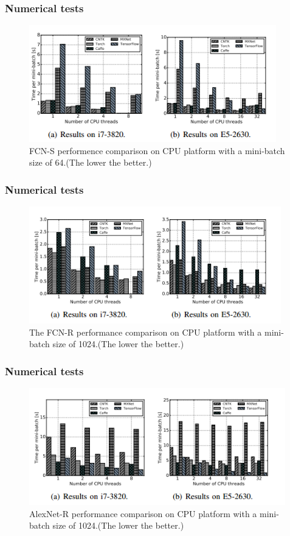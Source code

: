 %

\begin{frame}
	\MyLogo
	\frametitle{Numerical tests}  
	\begin{figure}[htbp] 
		\includegraphics[height=2.0in]{figures/FCN-S1.png} 
		\caption{FCN-S performence comparison on CPU platform with a mini-batch size of 64.(The lower the better.)}
	\end{figure}
\end{frame}
%

\begin{frame}
	\MyLogo
	\frametitle{Numerical tests}  
	\begin{figure}[htbp] 
		\includegraphics[height=2in]{figures/FCN-R1.png} 
		\caption{The FCN-R performance comparison on CPU platform with a mini-batch size of 1024.(The lower the better.)}
	\end{figure}
\end{frame}
%

\begin{frame}
	\MyLogo
	\frametitle{Numerical tests}  
	\begin{figure}[htbp] 
		\includegraphics[height=2in]{figures/AlexNet-R1.png} 
		\caption{AlexNet-R performance comparison on CPU platform with a mini-batch size of 1024.(The lower the better.)}
	\end{figure}
\end{frame}
%

